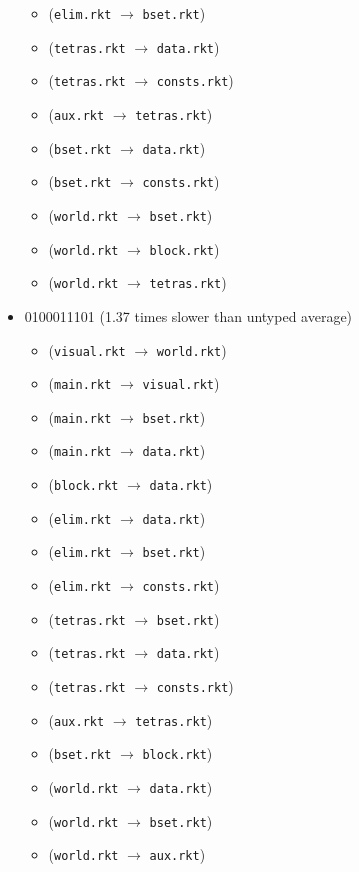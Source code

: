 \documentclass{article}
\newcommand{\mono}[1]{\texttt{#1}}
\begin{document}
\begin{itemize}
\begin{itemize}
  \item (\mono{elim.rkt} $\rightarrow$ \mono{bset.rkt})
  \item (\mono{tetras.rkt} $\rightarrow$ \mono{data.rkt})
  \item (\mono{tetras.rkt} $\rightarrow$ \mono{consts.rkt})
  \item (\mono{aux.rkt} $\rightarrow$ \mono{tetras.rkt})
  \item (\mono{bset.rkt} $\rightarrow$ \mono{data.rkt})
  \item (\mono{bset.rkt} $\rightarrow$ \mono{consts.rkt})
  \item (\mono{world.rkt} $\rightarrow$ \mono{bset.rkt})
  \item (\mono{world.rkt} $\rightarrow$ \mono{block.rkt})
  \item (\mono{world.rkt} $\rightarrow$ \mono{tetras.rkt})
  \end{itemize}
\item 0100011101 (1.37 times slower than untyped average)
  \begin{itemize}
  \item (\mono{visual.rkt} $\rightarrow$ \mono{world.rkt})
  \item (\mono{main.rkt} $\rightarrow$ \mono{visual.rkt})
  \item (\mono{main.rkt} $\rightarrow$ \mono{bset.rkt})
  \item (\mono{main.rkt} $\rightarrow$ \mono{data.rkt})
  \item (\mono{block.rkt} $\rightarrow$ \mono{data.rkt})
  \item (\mono{elim.rkt} $\rightarrow$ \mono{data.rkt})
  \item (\mono{elim.rkt} $\rightarrow$ \mono{bset.rkt})
  \item (\mono{elim.rkt} $\rightarrow$ \mono{consts.rkt})
  \item (\mono{tetras.rkt} $\rightarrow$ \mono{bset.rkt})
  \item (\mono{tetras.rkt} $\rightarrow$ \mono{data.rkt})
  \item (\mono{tetras.rkt} $\rightarrow$ \mono{consts.rkt})
  \item (\mono{aux.rkt} $\rightarrow$ \mono{tetras.rkt})
  \item (\mono{bset.rkt} $\rightarrow$ \mono{block.rkt})
  \item (\mono{world.rkt} $\rightarrow$ \mono{data.rkt})
  \item (\mono{world.rkt} $\rightarrow$ \mono{bset.rkt})
  \item (\mono{world.rkt} $\rightarrow$ \mono{aux.rkt})

\end{itemize}
\end{itemize}
\end{document}
